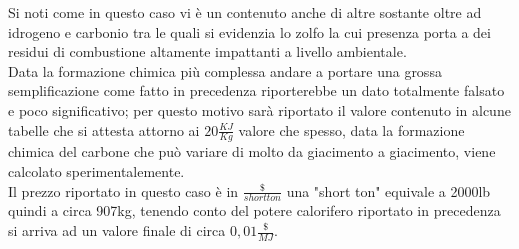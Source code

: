 Si noti come in questo caso vi è un contenuto anche di altre sostante oltre ad idrogeno e carbonio tra le quali si evidenzia lo zolfo la cui presenza porta a dei residui di combustione altamente impattanti a livello ambientale.\\
Data la formazione chimica più complessa andare a portare una grossa semplificazione come fatto in precedenza riporterebbe un dato totalmente falsato e poco significativo; per questo motivo sarà riportato il valore contenuto in alcune tabelle che si attesta attorno ai  $20\frac{KJ}{Kg}$ valore che spesso, data la formazione chimica del carbone che può variare di molto da giacimento a giacimento, viene calcolato sperimentalemente.\\
Il prezzo riportato in questo caso è in $\frac{\$}{short ton}$ una "short ton" equivale a 2000lb quindi a circa 907kg, tenendo conto del potere calorifero riportato in precedenza si arriva ad un valore finale di circa $0,01\frac{\$}{MJ}$.
\newpage
